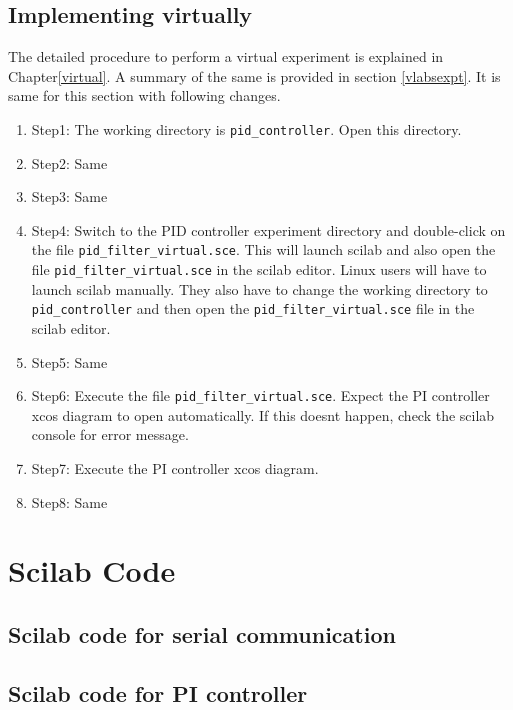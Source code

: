 \subsection{Implementing virtually}

The detailed procedure to perform a virtual experiment is explained in Chapter\ref{virtual}. A summary of the same is provided in section \ref{vlabsexpt}. It is same for this section with following changes.

\begin{enumerate}
\item Step1: The working directory is {\tt  pid\_controller}. Open this directory.
\item Step2: Same
\item Step3: Same
\item Step4:  Switch to the PID controller experiment directory and double-click on the file {\tt pid\_filter\_virtual.sce}. This will launch scilab and also open the file {\tt pid\_filter\_virtual.sce} in the scilab editor. Linux users will have to launch scilab manually. They also have to change the working directory to {\tt pid\_controller} and then open the {\tt  pid\_filter\_virtual.sce} file in the scilab editor.
\item Step5: Same
\item Step6: Execute the file {\tt pid\_filter\_virtual.sce}.  Expect the PI controller xcos diagram to open automatically. If this doesnt happen, check the scilab console for error message.
\item Step7: Execute the PI controller xcos diagram.
\item Step8: Same
\end{enumerate}



\section{Scilab Code}\label{pidcodes}
\subsection{Scilab code for serial communication}
\begin{code}

\end{code}
\subsection{Scilab code for PI controller}
\begin{code}

\end{code}
\begin{code}

\end{code}
\begin{code}

\end{code}
